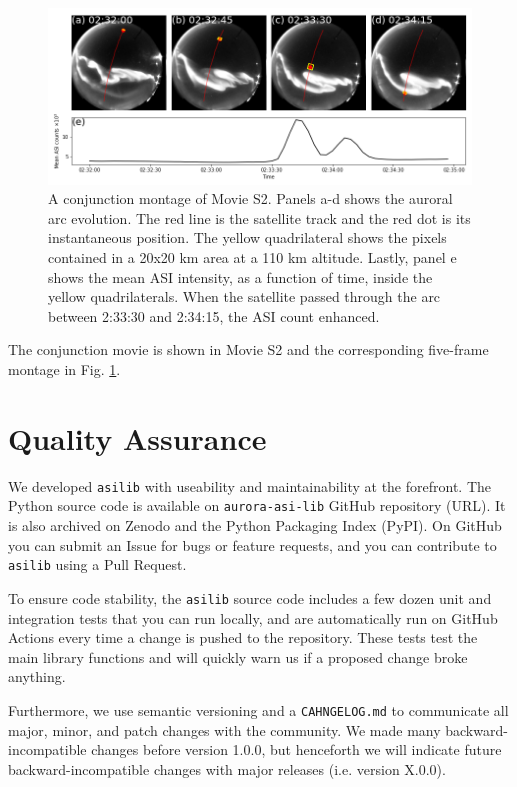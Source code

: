 \documentclass[draft]{agujournal2019}
\begin{document}
\begin{figure}
      \includegraphics[width=\textwidth]{figures/fig4.png}
      \caption{A conjunction montage of Movie S2. Panels a-d shows the auroral arc evolution. The red line is the satellite track and the red dot is its instantaneous position. The yellow quadrilateral shows the pixels contained in a 20x20 km area at a 110 km altitude. Lastly, panel e shows the mean ASI intensity, as a function of time, inside the yellow quadrilaterals. When the satellite passed through the arc between 2:33:30 and 2:34:15, the ASI count enhanced.}
      \label{fig4}
\end{figure}

The conjunction movie is shown in Movie S2 and the corresponding five-frame montage in Fig. \ref{fig4}.

\section{Quality Assurance}
We developed \verb|asilib| with useability and maintainability at the forefront. The Python source code is available on \verb|aurora-asi-lib| GitHub repository (URL). It is also archived on Zenodo and the Python Packaging Index (PyPI). On GitHub you can submit an Issue for bugs or feature requests, and you can contribute to \verb|asilib| using a Pull Request. 

To ensure code stability, the \verb|asilib| source code includes a few dozen unit and integration tests that you can run locally, and are automatically run on GitHub Actions every time a change is pushed to the repository. These tests test the main library functions and will quickly warn us if a proposed change broke anything.

Furthermore, we use semantic versioning and a \verb|CAHNGELOG.md| to communicate all major, minor, and patch changes with the community. We made many backward-incompatible changes before version 1.0.0, but henceforth we will indicate future backward-incompatible changes with major releases (i.e. version X.0.0). 
\end{document}
